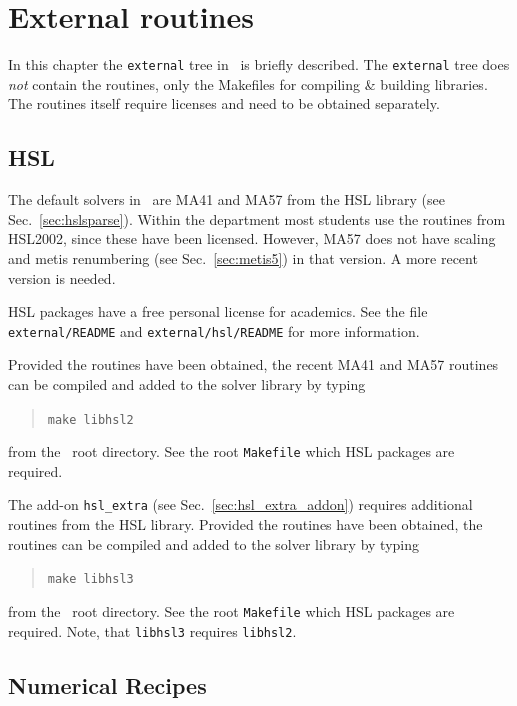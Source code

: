 
\chapter{External routines}

\label{ch:external}

\def\chaptertitle{External routines}
\def\headdate{11th March 2016}

In this chapter the \texttt{external} tree in \tfem\ is briefly described. The \texttt{external} tree
does \emph{not} contain the routines, only the Makefiles for compiling \& building
libraries. The routines itself require licenses and need to be obtained
separately.

\section{HSL}
\label{sec:hsl_external}

The default solvers in \tfem\ are MA41 and MA57 from the HSL library (see Sec.~\ref{sec:hslsparse}).
Within the department most students use the routines from HSL2002, since these have been licensed. However, MA57 does not have scaling and metis renumbering (see Sec.~\ref{sec:metis5}) in that version. A more recent version is needed. 

HSL packages have a free personal license for academics. 
See the file \texttt{external/README} and \texttt{external/hsl/README} for more information. 

Provided the routines have been obtained, the recent MA41 and MA57 routines can be compiled and added to the solver library by
typing
\begin{quote}
   \texttt{make libhsl2}
\end{quote}
from the \tfem\ root directory. See the root \texttt{Makefile} which HSL packages are required.

The add-on \texttt{hsl\_extra} (see Sec.~\ref{sec:hsl_extra_addon}) requires additional routines from the HSL library. Provided the routines have been obtained, the routines can be compiled and added to the solver library by
typing
\begin{quote}
   \texttt{make libhsl3}
\end{quote}
from the \tfem\ root directory. See the root \texttt{Makefile} which HSL packages are required. Note, that \texttt{libhsl3} requires \texttt{libhsl2}.

\section{Numerical Recipes}
\label{sec:nr}

